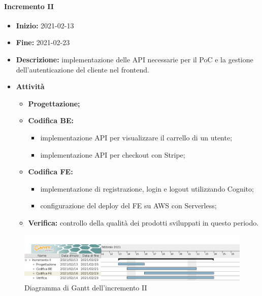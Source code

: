 \paragraph[Incremento II]{Incremento II}
\begin{itemize}
    \item [] \textbf{Inizio:} 2021-02-13
    \item [] \textbf{Fine:} 2021-02-23
    \item [] \textbf{Descrizione:} implementazione delle API necessarie per il PoC e la gestione dell'autenticazione del cliente nel frontend.
    \item [] \textbf{Attività}
          \begin{itemize}
              \item \textbf{Progettazione;}
              \item \textbf{Codifica BE:}
                    \begin{itemize}
                        \item implementazione API per visualizzare il carrello di un utente;
                        \item implementazione API per checkout con Stripe;
                    \end{itemize}
              \item \textbf{Codifica FE:}
                    \begin{itemize}
                        \item implementazione di registrazione, login e logout utilizzando Cognito;
                        \item configurazione del deploy del FE su AWS con Serverless;
                    \end{itemize}
              \item \textbf{Verifica:} controllo della qualità dei prodotti sviluppati in questo periodo.
          \end{itemize}
\end{itemize}

\begin{figure}[H]
    \centering
    \includegraphics[width=1\linewidth]{res/images/pianificazione/incremento_2.png}
    \caption{Diagramma di Gantt dell'incremento II}
    \label{fig:_Gantt incremento II}
\end{figure}

